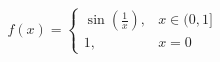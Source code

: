 \documentclass[preview]{standalone}
\begin{document}
\begin{align*}
f(x) = \begin{cases} \sin\left(\frac{1}{x}\right), & x \in (0, 1] \\ 1, & x = 0 \end{cases}
\end{align*}
\end{document}
